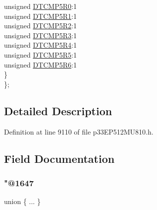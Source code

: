 \begin{DoxyCompactItemize}
\begin{tabbing}
\>\>unsigned \hyperlink{structtag_r_p_i_n_r40_b_i_t_s_a53dfac529af9fd6b8ff9525269fb0894}{DTCMP5R0}:1\\
\>\>unsigned \hyperlink{structtag_r_p_i_n_r40_b_i_t_s_ad746b4827fb1db48861e3aab7bcc32ac}{DTCMP5R1}:1\\
\>\>unsigned \hyperlink{structtag_r_p_i_n_r40_b_i_t_s_a59eece702b5a3d32a1702c4ca77302f2}{DTCMP5R2}:1\\
\>\>unsigned \hyperlink{structtag_r_p_i_n_r40_b_i_t_s_a6a08f0d70e2bafc9a14b621dda747963}{DTCMP5R3}:1\\
\>\>unsigned \hyperlink{structtag_r_p_i_n_r40_b_i_t_s_ab7ee028c6bb9b48e10507e4673f5f2c7}{DTCMP5R4}:1\\
\>\>unsigned \hyperlink{structtag_r_p_i_n_r40_b_i_t_s_ad9e9c10db04c5ff7ac3a7f0663029b62}{DTCMP5R5}:1\\
\>\>unsigned \hyperlink{structtag_r_p_i_n_r40_b_i_t_s_a6cae0af6fa363377764e896e4ff5c858}{DTCMP5R6}:1\\
\>\} \\
\}; \\

\end{tabbing}\end{DoxyCompactItemize}


\subsection{Detailed Description}


Definition at line 9110 of file p33\+E\+P512\+M\+U810.\+h.



\subsection{Field Documentation}
\mbox{\label{structtag_r_p_i_n_r40_b_i_t_s_a5a69ba1439e81b525966e60b11e0ab6b}} 
\subsubsection{\texorpdfstring{"@1647}{@1647}}
{\footnotesize\ttfamily union \{ ... \} }

\mbox{\label{structtag_r_p_i_n_r40_b_i_t_s_adf71f3d8410c1f1dbbc96680a92c49af}} 
